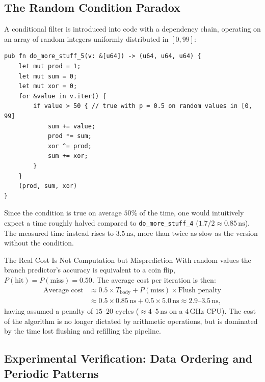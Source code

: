 \subsection{The Random Condition Paradox}

A conditional filter is introduced into code with a dependency chain, operating on an array of random integers uniformly distributed in $[0, 99]$:

\begin{lstlisting}[style=rustcode,caption={Conditional branch on random values: the CPU cannot predict the outcome.}]
pub fn do_more_stuff_5(v: &[u64]) -> (u64, u64, u64) {
    let mut prod = 1;
    let mut sum = 0;
    let mut xor = 0;
    for &value in v.iter() {
        if value > 50 { // true with p = 0.5 on random values in [0, 99]
            sum += value;
            prod *= sum;
            xor ^= prod;
            sum += xor;
        }
    }
    (prod, sum, xor)
}
\end{lstlisting}

Since the condition is true on average $50\%$ of the time, one would intuitively expect a time roughly halved compared to \texttt{do\_more\_stuff\_4} ($1.7 / 2 \approx 0.85\,\text{ns}$). The measured time instead rises to $3.5\,\text{ns}$, more than twice as slow as the version without the condition.

\begin{alertblock}{The Real Cost Is Not Computation but Misprediction}
With random values the branch predictor's accuracy is equivalent to a coin flip, $P(\text{hit}) = P(\text{miss}) = 0.50$. The average cost per iteration is then:
\[
\begin{aligned}
  \text{Average cost} &\approx 0.5 \times T_{\text{body}} + P(\text{miss}) \times \text{Flush penalty} \\
                      &\approx 0.5 \times 0.85\,\text{ns} + 0.5 \times 5.0\,\text{ns} \approx 2.9\text{--}3.5\,\text{ns},
\end{aligned}
\]
having assumed a penalty of $15$--$20$ cycles ($\approx 4$--$5\,\text{ns}$ on a $4\,\text{GHz}$ CPU). The cost of the algorithm is no longer dictated by arithmetic operations, but is dominated by the time lost flushing and refilling the pipeline.
\end{alertblock}

\subsection{Experimental Verification: Data Ordering and Periodic Patterns}

